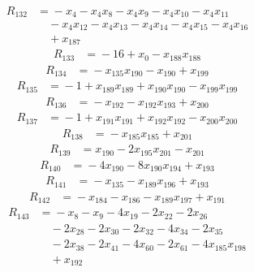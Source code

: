 \begin{align*}
R_{132}&={}-x_{4} -x_{4}x_{8} -x_{4}x_{9} -x_{4}x_{10} -x_{4}x_{11}\\
&\quad{}-x_{4}x_{12} -x_{4}x_{13} -x_{4}x_{14} -x_{4}x_{15} -x_{4}x_{16}\\
&\quad{}+x_{187}
\end{align*}
\begin{align*}
R_{133}&={}-16 +x_{0} -x_{188}x_{188}
\end{align*}
\begin{align*}
R_{134}&={}-x_{135}x_{190} -x_{190} +x_{199}
\end{align*}
\begin{align*}
R_{135}&={}-1 +x_{189}x_{189} +x_{190}x_{190} -x_{199}x_{199}
\end{align*}
\begin{align*}
R_{136}&={}-x_{192} -x_{192}x_{193} +x_{200}
\end{align*}
\begin{align*}
R_{137}&={}-1 +x_{191}x_{191} +x_{192}x_{192} -x_{200}x_{200}
\end{align*}
\begin{align*}
R_{138}&={}-x_{185}x_{185} +x_{201}
\end{align*}
\begin{align*}
R_{139}&={}x_{190} -2x_{195}x_{201} -x_{201}
\end{align*}
\begin{align*}
R_{140}&={}-4x_{190} -8x_{190}x_{194} +x_{193}
\end{align*}
\begin{align*}
R_{141}&={}-x_{135} -x_{189}x_{196} +x_{193}
\end{align*}
\begin{align*}
R_{142}&={}-x_{184} -x_{186} -x_{189}x_{197} +x_{191}
\end{align*}
\begin{align*}
R_{143}&={}-x_{8} -x_{9} -4x_{19} -2x_{22} -2x_{26}\\
&\quad{}-2x_{28} -2x_{30} -2x_{32} -4x_{34} -2x_{35}\\
&\quad{}-2x_{38} -2x_{41} -4x_{60} -2x_{61} -4x_{185}x_{198}\\
&\quad{}+x_{192}
\end{align*}
